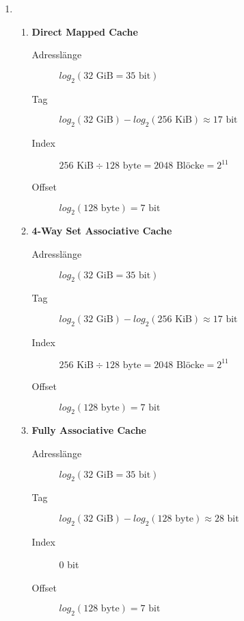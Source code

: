 \documentclass[a4paper, 12pt, margins=2cm]{homework}
\begin{document}
\begin{problem}
  
\end{problem}
\begin{solution}\hfill

  \begin{enumerate}[label=(\alph*)]\itemsep0pt

    \item \hfill 
      \begin{enumerate}[label=(\arabic*)]\itemsep0pt
        \item \textbf{Direct Mapped Cache}
          \begin{description}
            \item[Adresslänge] $log_2(32 \text{ GiB} = 35\text{ bit})$
            \item[Tag] $log_2(32 \text{ GiB}) - log_2(256 \text{ KiB}) \approx 17 \text{ bit}$
            \item[Index] $256 \text{ KiB} \div 128 \text{ byte} = 2048 \text{ Blöcke} = 2^{11}$
            \item[Offset] $log_2(128 \text{ byte}) = 7 \text{ bit}$
          \end{description}
        \item \textbf{4-Way Set Associative Cache}
          \begin{description}
            \item[Adresslänge] $log_2(32 \text{ GiB} = 35\text{ bit})$
            \item[Tag] $log_2(32 \text{ GiB}) - log_2(256 \text{ KiB}) \approx 17 \text{ bit}$
            \item[Index] $256 \text{ KiB} \div 128 \text{ byte} = 2048 \text{ Blöcke} = 2^{11}$
            \item[Offset] $log_2(128 \text{ byte}) = 7 \text{ bit}$
          \end{description}
        \item \textbf{Fully Associative Cache}
          \begin{description}
            \item[Adresslänge] $log_2(32 \text{ GiB} = 35\text{ bit})$
            \item[Tag] $log_2(32 \text{ GiB}) - log_2(128 \text{ byte}) \approx 28 \text{ bit}$
            \item[Index] 0 bit
            \item[Offset] $log_2(128 \text{ byte}) = 7 \text{ bit}$
          \end{description}
      \end{enumerate}


\end{enumerate}
\end{solution}
\end{document}
